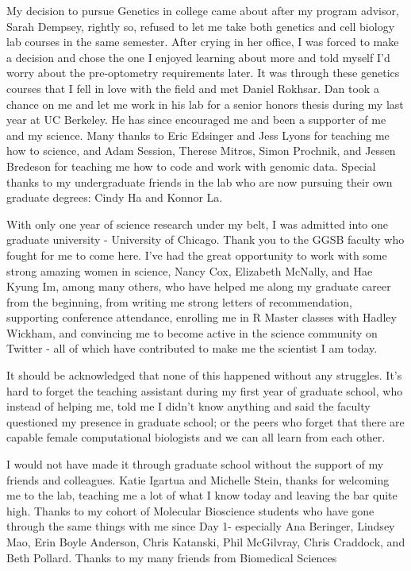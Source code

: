 \acknowledgments





My decision to pursue Genetics in college came about after my program advisor, Sarah Dempsey, rightly so, refused to let me take both genetics and cell biology lab courses in the same semester. After crying in her office, I was forced to make a decision and chose the one I enjoyed learning about more and told myself I'd worry about the pre-optometry requirements later. It was through these genetics courses that I fell in love with the field and met Daniel Rokhsar. Dan took a chance on me and let me work in his lab for a senior honors thesis during my last year at UC Berkeley. He has since encouraged me and been a supporter of me and my science. Many thanks to Eric Edsinger and Jess Lyons for teaching me how to science, and Adam Session, Therese Mitros, Simon Prochnik, and Jessen Bredeson for teaching me how to code and work with genomic data. Special thanks to my undergraduate friends in the lab who are now pursuing their own graduate degrees: Cindy Ha and Konnor La. 

With only one year of science research under my belt, I was admitted into one graduate university - University of Chicago. Thank you to the GGSB faculty who fought for me to come here. I've had the great opportunity to work with some strong amazing women in science, Nancy Cox, Elizabeth McNally, and Hae Kyung Im, among many others, who have helped me along my graduate career from the beginning, from writing me strong letters of recommendation, supporting conference attendance, enrolling me in R Master classes with Hadley Wickham, and convincing me to become active in the science community on Twitter - all of which have contributed to make me the scientist I am today.

It should be acknowledged that none of this happened without any struggles. It's hard to forget the teaching assistant during my first year of graduate school, who instead of helping me, told me I didn't know anything and said the faculty questioned my presence in graduate school; or the peers who forget that there are capable female computational biologists and we can all learn from each other.

I would not have made it through graduate school without the support of my friends and colleagues. Katie Igartua and Michelle Stein, thanks for welcoming me to the lab, teaching me a lot of what I know today and leaving the bar quite high. Thanks to my cohort of Molecular Bioscience students who have gone through the same things with me since Day 1- especially Ana Beringer, Lindsey Mao, Erin Boyle Anderson, Chris Katanski, Phil McGilvray, Chris Craddock, and Beth Pollard. Thanks to my many friends from Biomedical Sciences 

